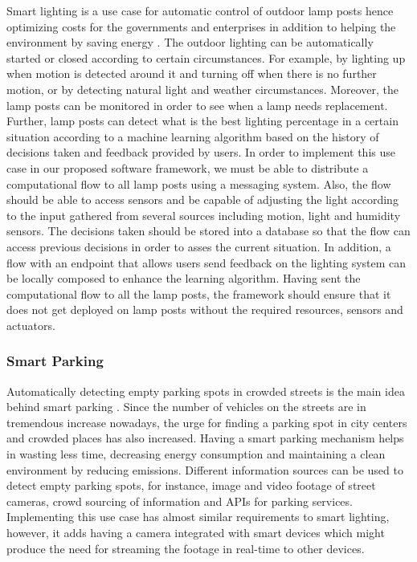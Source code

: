 Smart lighting is a use case for automatic control of outdoor lamp posts hence optimizing costs for the governments and enterprises in addition to helping the environment by saving energy \cite{6740844}. The outdoor lighting can be automatically started or closed according to certain circumstances. For example, by lighting up when motion is detected   around it and turning off when there is no further motion, or by detecting natural light  and weather circumstances. Moreover, the lamp posts can be monitored in order to see when a lamp needs replacement.  Further, lamp posts can detect what is the best lighting percentage in a certain situation according to a machine learning algorithm based on the history of decisions taken and feedback provided by users.  In order to implement this use case in our proposed software framework, we must be able to distribute a computational flow to all lamp posts using a messaging system.  Also, the flow should be able to access sensors and be capable of adjusting the light according to the input gathered from several sources including motion, light and humidity sensors.  The decisions taken  should  be   stored into a database so that the flow can access  previous decisions in order to asses the current situation. In addition, a flow with an endpoint that  allows users send feedback on the lighting system can be locally composed to enhance the learning algorithm. Having sent the computational flow to all the lamp posts, the framework should ensure that it does not get deployed on lamp posts without the  required resources, sensors and actuators. 

\subsubsection{Smart Parking}

Automatically detecting empty parking spots in crowded streets is the main idea behind smart parking \cite{4543911}. Since the number of vehicles on the streets are in tremendous increase nowadays, the urge for finding a parking spot in city centers and crowded places has also increased. Having a smart parking mechanism helps in wasting less time, decreasing energy consumption and maintaining a clean environment by reducing emissions.  Different information sources can be used to  detect empty parking spots, for instance, image and video footage of street cameras, crowd sourcing of information and APIs for parking services. Implementing this use case has almost similar requirements to smart lighting, however, it adds having  a camera integrated with smart devices which might produce the need for streaming the footage in real-time to other devices.

